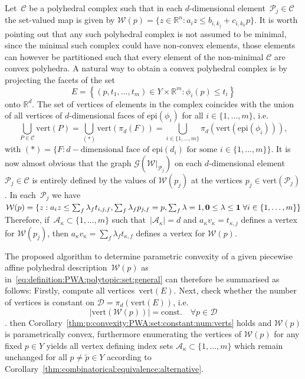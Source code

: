 \documentclass{elsarticle}
\providecommand{\abs}[1]{\left|#1\right|}
\providecommand{\epi}{\text{epi}}
\theoremstyle{remark}
\theoremstyle{definition}
\begin{document}
Let~$\mathcal C$ be a polyhedral complex such that in each $d$-dimensional element~$\mathcal P_j\in\mathcal C$ the set-valued map is given by $\mathcal W(p) = \{z\in\mathbb R^n:a_i z\leq b_{i,k_j} + c_{i,k_k} p\}$. 
%
It is worth pointing out that any such polyhedral complex is not assumed to be minimal, since the minimal such complex could have non-convex elements, those elements can however be partitioned such that every element of the non-minimal $\mathcal C$ are convex polyhedra. 
%
A natural way to obtain a convex polyhedral complex is by projecting the facets of the set
%
\begin{equation}
  E=\left\{(p,t_1,\dots,t_m)\in Y\times\mathbb R^{m}:\phi_i(p)\leq t_i\right\}
\end{equation}
%
onto $\mathbb R^d$.
%
The set of vertices of elements in the complex coincides with the union of all vertices of $d$-dimensional faces of $\epi(\phi_i)$ for all $i\in\{1,\dots,m\}$, i.e.
%
$$
	\bigcup_{P\in\mathcal C}\text{vert}(P) = \bigcup_{(\ast)} \text{vert}(\pi_d(F)) = \bigcup_{i\in\{1,\dots,m\}}\pi_d(\text{vert}(\epi(\phi_i))),
$$
%
with $(\ast) = \{F: d-\text{dimensional face of } \epi(d_i) \text{ for some } i\in\{1,\dots,m\}\}$.
%
It is now almost obvious that the graph $\mathscr G(\mathcal W\vert_{\mathcal P_j})$ on each $d$-dimensional element $\mathcal P_j\in\mathcal C$ is entirely defined by the values of $\mathcal W(p_j)$ at the vertices $p_j\in\text{vert}(\mathcal P_j)$.
%
In each~$\mathcal P_j$ we have $\mathcal W(p) = \{z: a_i z\leq \sum_f \lambda_f t_{i,j,f}, \sum_f\lambda_f p_{j,f}=p, \sum_f\lambda=1,{\bf{0}}\leq\lambda\leq{\bf{1}}\; \forall i\in\{1,\dots,m\}\}$
%
Therefore, if~$\mathcal A_\kappa\subset\{1,\dots,m\}$ such that~$\abs{\mathcal A_\kappa}=d$ and $a_\kappa v_\kappa = t_{\kappa,j}$ defines a vertex for $\mathcal W(p_j)$, then $a_\kappa v_\kappa = \sum_f \lambda_f t_{\kappa,f}$ defines a vertex for $\mathcal W(p)$.

The proposed algorithm to determine parametric convexity of a given piecewise affine polyhedral description~$\mathcal W(p)$ as in~\eqref{eq:definition:PWA:polytopic:set:general} can therefore be summarised as follows:
%
Firstly, compute all vertices~$\text{vert}(E)$.
%
Next, check whether the number of vertices is constant on $\mathcal D = \pi_d\left(\text{vert}(E)\right)$, i.e. 
%
$$\abs{\text{vert}(\mathcal W(p))} = \text{const.}\quad \forall p\in\mathcal D$$.
%
then Corollary~\ref{thm:p:convexity:PWA:set:constant:num:verts} holds and $\mathcal W(p)$ is parametrically convex, furthermore enumerating the vertices of $\mathcal W(p)$ for any fixed $p\in Y$ yields all vertex defining index sets $\mathcal A_\kappa\subset\{1,\dots,m\}$ which remain unchanged for all $p\neq\tilde p\in Y$ according to Corollary~\ref{thm:combinatorical:equivalence:alternative}.
%
\end{document}
